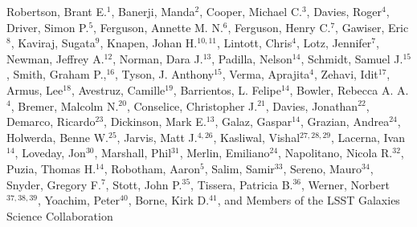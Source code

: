 Robertson, Brant E.$^{1}$, 
Banerji, Manda$^{2}$,
Cooper, Michael C.$^{3}$,
Davies, Roger$^{4}$,
Driver, Simon P.$^{5}$,
Ferguson, Annette M. N.$^{6}$,
Ferguson, Henry C.$^{7}$,
Gawiser, Eric$^{8}$,
Kaviraj, Sugata$^{9}$,
Knapen, Johan H.$^{10,11}$,
Lintott, Chris$^{4}$,
Lotz, Jennifer$^{7}$,
Newman, Jeffrey A.$^{12}$,
Norman, Dara J.$^{13}$,
Padilla, Nelson$^{14}$,
Schmidt, Samuel J.$^{15}$,
Smith, Graham P.,$^{16}$,
Tyson, J. Anthony$^{15}$,
Verma, Aprajita$^{4}$,
Zehavi, Idit$^{17}$,
Armus, Lee$^{18}$,
Avestruz, Camille$^{19}$,
Barrientos, L. Felipe$^{14}$,
Bowler, Rebecca A. A.$^{4}$,
Bremer, Malcolm N.$^{20}$,
Conselice, Christopher J.$^{21}$,
Davies, Jonathan$^{22}$,
Demarco, Ricardo$^{23}$,
Dickinson, Mark E.$^{13}$,
Galaz, Gaspar$^{14}$,
Grazian, Andrea$^{24}$,
Holwerda, Benne W.$^{25}$,
Jarvis, Matt J.$^{4,26}$,
Kasliwal, Vishal$^{27,28,29}$,
Lacerna, Ivan$^{14}$,
Loveday, Jon$^{30}$,
Marshall, Phil$^{31}$,
Merlin, Emiliano$^{24}$,
Napolitano, Nicola R.$^{32}$,
Puzia, Thomas H.$^{14}$,
Robotham, Aaron$^{5}$,
Salim, Samir$^{33}$,
Sereno, Mauro$^{34}$,
Snyder, Gregory F.$^{7}$,
Stott, John P.$^{35}$,
Tissera, Patricia B.$^{36}$,
Werner, Norbert$^{37,38,39}$,
Yoachim, Peter$^{40}$,
Borne, Kirk D.$^{41}$,
and Members of the LSST Galaxies Science Collaboration 

\vspace*{5mm}

